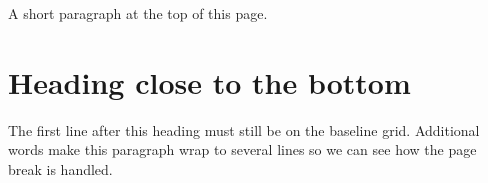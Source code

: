\documentclass{article}
\begin{document}
\noindent A short paragraph at the top of this page.\par
\vspace*{535pt}
\section{Heading close to the bottom}
The first line after this heading must still be on the baseline grid. Additional words make this paragraph wrap to several lines so we can see how the page break is handled.
\end{document}
